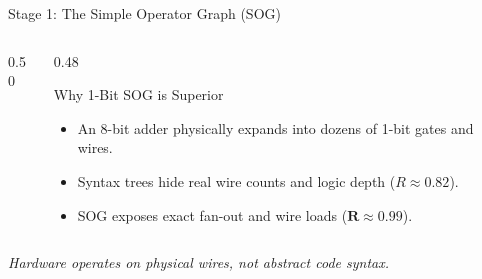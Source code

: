 \documentclass[aspectratio=169,10pt]{beamer}
\begin{document}
\begin{frame}{Stage 1: The Simple Operator Graph (SOG)}
    \begin{columns}[c]
        \begin{column}{0.50\textwidth}
            \centering
        \end{column}
        \begin{column}{0.48\textwidth}
            \begin{block}{\centering Why 1-Bit SOG is Superior}
                \footnotesize
                \begin{itemize}
                    \item An 8-bit adder physically expands into dozens of 1-bit gates and wires.
                    \item Syntax trees hide real wire counts and logic depth ($R \approx 0.82$).
                    \item SOG exposes exact fan-out and wire loads ($\mathbf{R \approx 0.99}$).
                \end{itemize}
            \end{block}
        \end{column}
    \end{columns}
    \vfill
    \begin{center}
        \small\textit{Hardware operates on physical wires, not abstract code syntax.}
    \end{center}
\end{frame}
\end{document}
